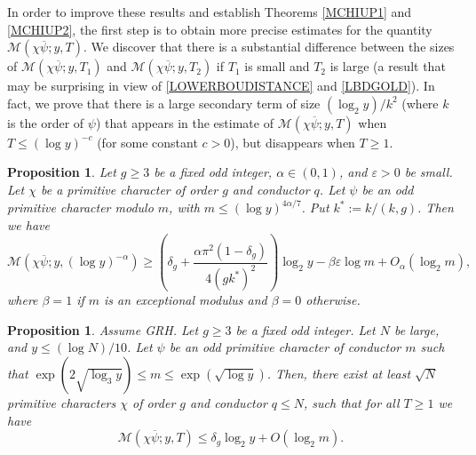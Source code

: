 \documentclass[12pt]{amsart}
\newtheorem{pro}[thm]{Proposition}
\theoremstyle{definition}
\numberwithin{equation}{section}
\newcommand{\mc}{\mathcal}
\newcommand{\e}{\varepsilon}
\renewcommand{\bar}{\overline}
\begin{document}
In order to improve these results and establish Theorems \ref{MCHIUP1} and \ref{MCHIUP2}, the first step is to obtain more precise estimates for the quantity $\mc{M}(\chi\bar{\psi};y, T)$. We discover that there is a substantial difference between the sizes of $\mc{M}(\chi\bar{\psi}; y, T_1)$ and $\mc{M}(\chi\bar{\psi}; y, T_2)$ if $T_1$ is small and $T_2$ is large (a result that may be surprising in view of \eqref{LOWERBOUDISTANCE} and \eqref{LBDGOLD}). In fact, we prove that there is a large secondary term of size $(\log_2y)/k^2$ (where $k$ is the order of $\psi$) that appears in the estimate of $\mc{M}(\chi\bar{\psi}; y, T)$ when $T\leq (\log y)^{-c}$ (for some constant $c>0$), but disappears when $T\geq 1$. 
\begin{pro}\label{MINDIST}
Let $g\geq 3$ be a fixed odd integer, $\alpha\in (0, 1)$, and $\e>0$ be small. Let $\chi$ be a primitive character of order $g$ and conductor $q$. Let $\psi$ be an odd primitive character modulo $m$, with $m \leq (\log y)^{4\alpha/7}$. Put $k^{\ast} := k/(k,g)$. Then we have\begin{equation} \label{LowerBoundDistance2}
\mc{M}(\chi\bar{\psi}; y, (\log y)^{-\alpha}) \geq \left(\delta_g + \frac{\alpha \pi^2(1-\delta_g)}{4(gk^{\ast})^2}\right) \log_2 y - \beta \e \log m+O_{\alpha}\left(\log_2 m\right),
\end{equation}
where $\beta = 1$ if $m$ is an exceptional modulus and $\beta = 0$ otherwise.
\end{pro}
\begin{pro} \label{AD}
Assume GRH. Let $g\geq 3$ be a fixed odd integer. Let $N$ be large, and $y\leq (\log N)/10$. Let $\psi$ be an odd primitive character of conductor $m$ such that  $\exp\left(2\sqrt{\log_3 y}\right) \leq m\leq \exp\left(\sqrt{\log y}\right)$. Then, there exist at least $\sqrt{N}$  primitive characters $\chi$ of order $g$ and conductor $q\leq N$, such that for all $T\geq 1$ we have
\begin{equation*}
\mc{M}(\chi\bar{\psi}; y, T) \leq \delta_g \log_2 y + O\left(\log_2 m\right).
\end{equation*}
\end{pro}
\end{document}

